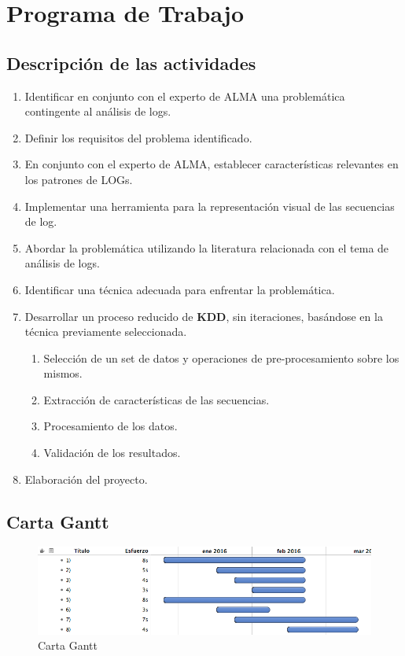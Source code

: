 \section{Programa de Trabajo}

\subsection{Descripción de las actividades}

\begin{enumerate}
	\item Identificar en conjunto con el experto de ALMA una problemática contingente al análisis de logs.

	\item Definir los requisitos del problema identificado.

	\item En conjunto con el experto de ALMA, establecer características relevantes en los patrones de LOGs.
	
	\item Implementar una herramienta para la representación visual de las secuencias de log.

	\item Abordar la problemática utilizando la literatura relacionada con el tema de análisis de logs.
	
	\item Identificar una técnica adecuada para enfrentar la problemática.
	
	\item Desarrollar un proceso reducido de \textbf{KDD}, sin iteraciones, basándose en la técnica previamente seleccionada.
	\begin{enumerate}
		\item Selección de un set de datos y operaciones de pre-procesamiento sobre los mismos.
		\item Extracción de características de las secuencias.
		\item Procesamiento de los datos.
		\item Validación de los resultados.
	\end{enumerate}
	
	\item Elaboración del proyecto.
	
\end{enumerate}

\subsection{Carta Gantt}

\begin{figure}[H]
\centering
\includegraphics[scale=0.5]{img/gantt}
\caption{Carta Gantt}
\end{figure}

